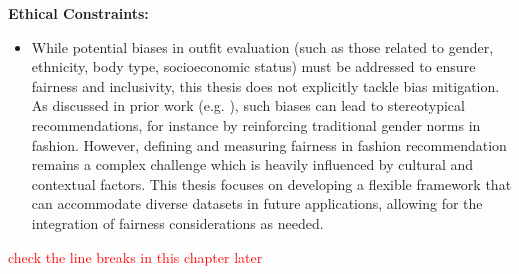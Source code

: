 \vspace{0.5cm}

\textbf{Ethical Constraints:}

\begin{itemize}
  \item While potential biases in outfit evaluation (such as those related to gender, ethnicity, body type, socioeconomic status) must be addressed to ensure fairness and inclusivity, this thesis does not explicitly tackle bias mitigation. As discussed in prior work (e.g. \cite[cf.]{deldjoo_review_2022}), such biases can lead to stereotypical recommendations, for instance by reinforcing traditional gender norms in fashion. However, defining and measuring fairness in fashion recommendation remains a complex challenge which is heavily influenced by cultural and contextual factors. This thesis focuses on developing a flexible framework that can accommodate diverse datasets in future applications, allowing for the integration of fairness considerations as needed.
\end{itemize}

\textcolor{red}{check the line breaks in this chapter later}